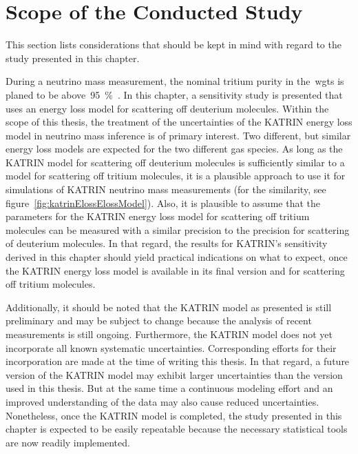 \section{Scope of the Conducted Study}
\label{sec:katrinElossValidity}
This section lists considerations that should be kept in mind with regard to the study presented in this chapter.

During a neutrino mass measurement, the nominal tritium purity in the~\gls{wgts} is planed to be above~\SI{95}{\percent}~\cite{Angrik:2005ep}. In this chapter, a sensitivity study is presented that uses an energy loss model for scattering off deuterium molecules. Within the scope of this thesis, the treatment of the uncertainties of the KATRIN energy loss model in neutrino mass inference is of primary interest. Two different, but similar energy loss models are expected for the two different gas species. As long as the KATRIN model for scattering off deuterium molecules is sufficiently similar to a model for scattering off tritium molecules, it is a plausible approach to use it for simulations of KATRIN neutrino mass measurements (for the similarity, see figure~\ref{fig:katrinElossElossModel}). Also, it is plausible to assume that the parameters for the KATRIN energy loss model for scattering off tritium molecules can be measured with a similar precision to the precision for scattering of deuterium molecules. In that regard, the results for KATRIN's sensitivity derived in this chapter should yield practical indications on what to expect, once the KATRIN energy loss model is available in its final version and for scattering off tritium molecules.

Additionally, it should be noted that the KATRIN model as presented is still preliminary and may be subject to change because the analysis of recent measurements is still ongoing. Furthermore, the KATRIN model does not yet incorporate all known systematic uncertainties. Corresponding efforts for their incorporation are made at the time of writing this thesis. In that regard, a future version of the KATRIN model may exhibit larger uncertainties than the version used in this thesis. But at the same time a continuous modeling effort and an improved understanding of the data may also cause reduced uncertainties. Nonetheless, once the KATRIN model is completed, the study presented in this chapter is expected to be easily repeatable because the necessary statistical tools are now readily implemented.
\FloatBarrier




